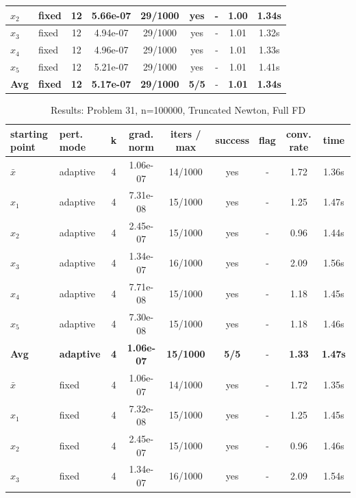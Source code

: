 \begin{longtable}{|l|l|c|c|c|c|c|c|c|}
\hline
$x_2$ & fixed & 12 & 5.66e-07 & 29/1000 & yes & - & 1.00 & 1.34s \\
\hline
$x_3$ & fixed & 12 & 4.94e-07 & 29/1000 & yes & - & 1.01 & 1.32s \\
\hline
$x_4$ & fixed & 12 & 4.96e-07 & 29/1000 & yes & - & 1.01 & 1.33s \\
\hline
$x_5$ & fixed & 12 & 5.21e-07 & 29/1000 & yes & - & 1.01 & 1.41s \\
\hline
\hline\hline
\textbf{Avg} & \textbf{fixed} & \textbf{12} & \textbf{5.17e-07} & \textbf{29/1000} & \textbf{5/5} & - & \textbf{1.01} & \textbf{1.34s} \\
\hline\hline
\end{longtable}


\begin{longtable}{|l|l|c|c|c|c|c|c|c|}
\caption{Results: Problem 31, n=100000, Truncated Newton, Full FD} \\
\hline
\textbf{starting point} & \textbf{pert. mode} & \textbf{k} & \textbf{grad. norm} & \textbf{iters / max} & \textbf{success} & \textbf{flag} & \textbf{conv. rate} & \textbf{time} \\
\hline
\endfirsthead
\endhead
\endfoot
\hline
\endlastfoot
$\bar{x}$ & adaptive & 4 & 1.06e-07 & 14/1000 & yes & - & 1.72 & 1.36s \\
\hline
$x_1$ & adaptive & 4 & 7.31e-08 & 15/1000 & yes & - & 1.25 & 1.47s \\
\hline
$x_2$ & adaptive & 4 & 2.45e-07 & 15/1000 & yes & - & 0.96 & 1.44s \\
\hline
$x_3$ & adaptive & 4 & 1.34e-07 & 16/1000 & yes & - & 2.09 & 1.56s \\
\hline
$x_4$ & adaptive & 4 & 7.71e-08 & 15/1000 & yes & - & 1.18 & 1.45s \\
\hline
$x_5$ & adaptive & 4 & 7.30e-08 & 15/1000 & yes & - & 1.18 & 1.46s \\
\hline
\hline\hline
\textbf{Avg} & \textbf{adaptive} & \textbf{4} & \textbf{1.06e-07} & \textbf{15/1000} & \textbf{5/5} & - & \textbf{1.33} & \textbf{1.47s} \\
\hline\hline
\hline
$\bar{x}$ & fixed & 4 & 1.06e-07 & 14/1000 & yes & - & 1.72 & 1.35s \\
\hline
$x_1$ & fixed & 4 & 7.32e-08 & 15/1000 & yes & - & 1.25 & 1.45s \\
\hline
$x_2$ & fixed & 4 & 2.45e-07 & 15/1000 & yes & - & 0.96 & 1.46s \\
\hline
$x_3$ & fixed & 4 & 1.34e-07 & 16/1000 & yes & - & 2.09 & 1.54s \\

\end{longtable}
